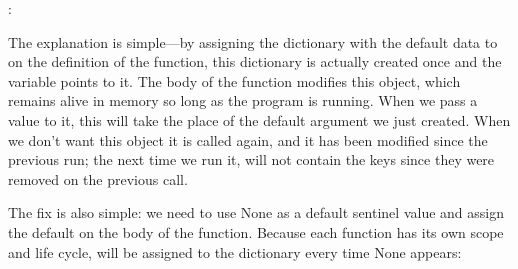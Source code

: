 \documentclass[a4paper,10pt,english]{sphinxmanual}
\begin{document}
\begin{sphinxVerbatim}[commandchars=\\\{\}]
   
: 
\end{sphinxVerbatim}

The explanation is simple—by assigning the dictionary with the default data to  on the definition of
the function, this dictionary is actually created once and the variable  points to it. The body of the
function modifies this object, which remains alive in memory so long as the program is running. When we pass a value to
it, this will take the place of the default argument we just created. When we don’t want this object it is called again,
and it has been modified since the previous run; the next time we run it, will not contain the keys since they were
removed on the previous call.

The fix is also simple: we need to use None as a default sentinel value and assign the default on the body of the
function. Because each function has its own scope and life cycle,  will be assigned to the dictionary
every time None appears:
\end{document}
